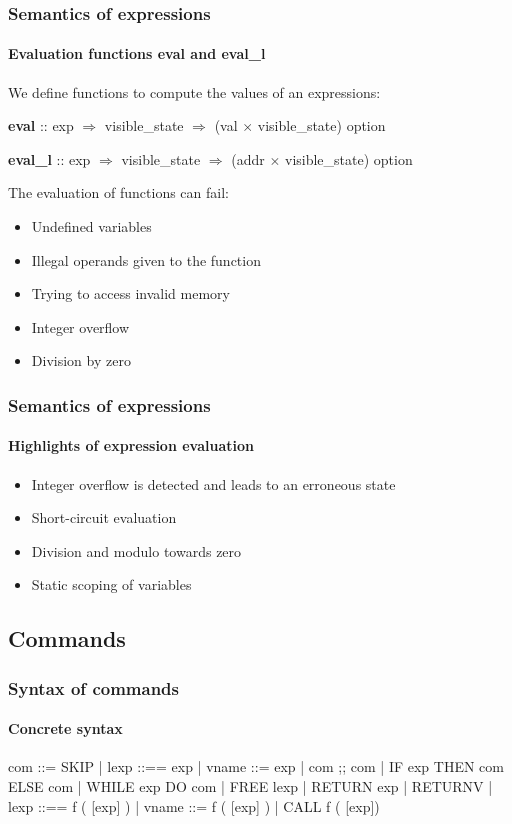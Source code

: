 \begin{frame}
\frametitle{Semantics of expressions}
\framesubtitle{Evaluation functions eval and eval\_l}

We define functions to compute the values of an expressions:

\bigskip

\textbf{eval} :: exp $\Rightarrow$ visible\_state $\Rightarrow$ (val $\times$ visible\_state) option

\textbf{eval\_l} :: exp $\Rightarrow$ visible\_state $\Rightarrow$ (addr $\times$ visible\_state) option

\bigskip

The evaluation of functions can fail:

\bigskip
\pause

\begin{itemize}
\item{Undefined variables}
\pause
\item{Illegal operands given to the function}
\pause
\item{Trying to access invalid memory}
\pause
\item{Integer overflow}
\pause
\item{Division by zero}
\end{itemize}


\end{frame}


\begin{frame}
\frametitle{Semantics of expressions}
\framesubtitle{Highlights of expression evaluation}

\begin{itemize}
\item{Integer overflow is detected and leads to an erroneous state}
\item{Short-circuit evaluation}
\item{Division and modulo towards zero}
\item{Static scoping of variables}
\end{itemize}


\end{frame}


\subsection{Commands}


\begin{frame}[fragile]
\frametitle{Syntax of commands}
\framesubtitle{Concrete syntax}

\begin{semiverbatim}
com ::= SKIP
     | lexp ::== exp
     | vname ::= exp
     | com ;; com
     | IF exp THEN com ELSE com
     | WHILE exp DO com
     | FREE lexp
     | RETURN exp
     | RETURNV
     | lexp ::== f ( [exp] )
     | vname ::= f ( [exp] )
     | CALL f ( [exp])
\end{semiverbatim}


\end{frame}


